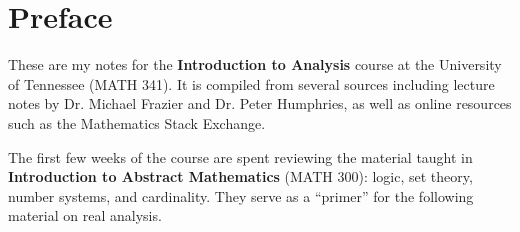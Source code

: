 \chapter*{Preface}
These are my notes for the \textbf{Introduction to Analysis} course at the University of Tennessee (MATH 341). It is compiled from several sources including lecture notes by Dr. Michael Frazier and Dr. Peter Humphries, as well as online resources such as the Mathematics Stack Exchange.


The first few weeks of the course are spent reviewing the material taught in \textbf{Introduction to Abstract Mathematics} (MATH 300): logic, set theory, number systems, and cardinality. They serve as a ``primer'' for the following material on real analysis.
